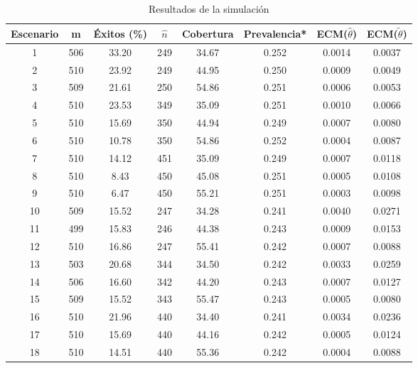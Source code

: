 \begin{table}[h]
	\centering
	\caption{Resultados de la simulación}
	\label{simu_resul}
	\begin{tabular}{cccccccc}
		\hline
		Escenario & m   & Éxitos (\%) & $\hat{n}$ & Cobertura & Prevalencia* & ECM($\hat{\theta}$) & ECM($\tilde{\theta}$) \\ \hline
		1         & 506 & 33.20      & 249        & 34.67     & 0.252       & 0.0014 & 0.0037 \\
		2         & 510 & 23.92      & 249        & 44.95     & 0.250       & 0.0009 & 0.0049 \\
		3         & 509 & 21.61      & 250        & 54.86     & 0.251       & 0.0006 & 0.0053 \\
		4         & 510 & 23.53      & 349        & 35.09     & 0.251       & 0.0010 & 0.0066 \\
		5         & 510 & 15.69      & 350        & 44.94     & 0.249       & 0.0007 & 0.0080 \\
		6         & 510 & 10.78      & 350        & 54.86     & 0.252       & 0.0004 & 0.0087 \\
		7         & 510 & 14.12      & 451        & 35.09     & 0.249       & 0.0007 & 0.0118 \\
		8         & 510 & 8.43       & 450        & 45.08     & 0.251       & 0.0005 & 0.0108 \\
		9         & 510 & 6.47       & 450        & 55.21     & 0.251       & 0.0003 & 0.0098 \\
		10        & 509 & 15.52      & 247        & 34.28     & 0.241       & 0.0040 & 0.0271 \\
		11        & 499 & 15.83      & 246        & 44.38     & 0.243       & 0.0009 & 0.0153 \\
		12        & 510 & 16.86      & 247        & 55.41     & 0.242       & 0.0007 & 0.0088 \\
		13        & 503 & 20.68      & 344        & 34.50     & 0.242       & 0.0033 & 0.0259 \\
		14        & 506 & 16.60      & 342        & 44.20     & 0.243       & 0.0007 & 0.0127 \\
		15        & 509 & 15.52      & 343        & 55.47     & 0.243       & 0.0005 & 0.0080 \\
		16        & 510 & 21.96      & 440        & 34.40     & 0.241       & 0.0034 & 0.0236 \\
		17        & 510 & 15.69      & 440        & 44.16     & 0.242       & 0.0005 & 0.0124 \\
		18        & 510 & 14.51      & 440        & 55.36     & 0.242       & 0.0004 & 0.0088 \\ \hline

\end{tabular}
\end{table}
